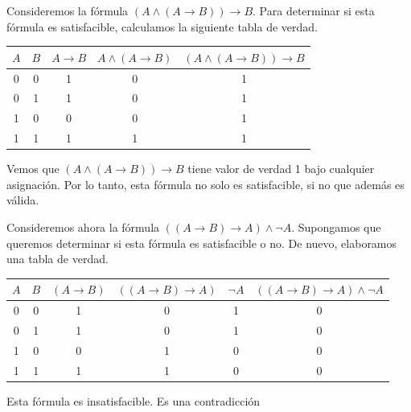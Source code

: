 \documentclass[12pt,a4paper]{book}
\begin{document}
    \begin{ejemplo}
        Consideremos la fórmula $(A\wedge(A\rightarrow B))\rightarrow B$. Para determinar si esta fórmula es satisfacible, calculamos la siguiente tabla
        de verdad.

        \begin{table}[htbp]
            \centering
            \renewcommand{\arraystretch}{1.5}
            \setlength{\tabcolsep}{10pt}
            \begin{tabular}{c | c | c | c | c}
                $A$ & $B$ & $A\rightarrow B$ & $A\wedge(A\rightarrow B)$ & $(A\wedge(A\rightarrow B))\rightarrow B$\\
                \hline
                0 & 0 & 1 & 0 & 1\\
                0 & 1 & 1 & 0 & 1\\
                1 & 0 & 0 & 0 & 1\\
                1 & 1 & 1 & 1 & 1
            \end{tabular}
        \end{table}
        
        Vemos que $(A\wedge(A\rightarrow B))\rightarrow B$ tiene valor de verdad 1 bajo cualquier asignación. Por lo tanto, esta fórmula no solo es
        satisfacible, si no que además es válida.
    \end{ejemplo}

    \vspace{2.4cm}

    \begin{ejemplo}
        Consideremos ahora la fórmula $((A\rightarrow B)\rightarrow A)\wedge\neg A$. Supongamos que queremos determinar si esta fórmula es satisfacible o no.
        De nuevo, elaboramos una tabla de verdad.

        \begin{table}[htbp]
            \centering
            \renewcommand{\arraystretch}{1.5}
            \setlength{\tabcolsep}{10pt}
            \begin{tabular}{c | c | c | c | c | c}
                $A$ & $B$ & $(A\rightarrow B)$ & $((A\rightarrow B)\rightarrow A)$ & $\neg A$ & $((A\rightarrow B)\rightarrow A)\wedge\neg A$\\ 
                \hline
                0 & 0 & 1 & 0 & 1 & 0 \\
                0 & 1 & 1 & 0 & 1 & 0 \\
                1 & 0 & 0 & 1 & 0 & 0 \\
                1 & 1 & 1 & 1 & 0 & 0
            \end{tabular}
        \end{table}

        Esta fórmula es insatisfacible. Es una contradicción
    \end{ejemplo}
\end{document}
